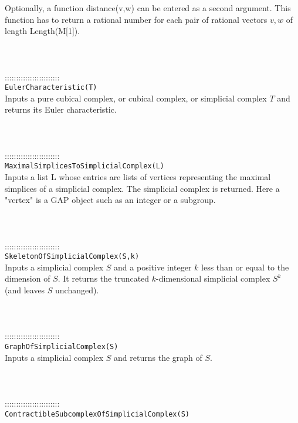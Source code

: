 \documentclass[a4paper,11pt]{report}
\begin{document}
{ Optionally, a function distance(v,w) can be entered as a second argument. This
function has to return a rational number for each pair of rational vectors $v,w$ of length Length(M[1]). \\
 \\
 \\
 \\
 ::::::::::::::::::::::::\\
 \texttt{EulerCharacteristic(T)}\\
 

 Inputs a pure cubical complex, or cubical complex, or simplicial complex $T$ and returns its Euler characteristic. \\
 \\
 \\
 \\
 ::::::::::::::::::::::::\\
 \texttt{MaximalSimplicesToSimplicialComplex(L)}\\
 

 Inputs a list L whose entries are lists of vertices representing the maximal
simplices of a simplicial complex. The simplicial complex is returned. Here a
"vertex" is a GAP object such as an integer or a subgroup. \\
 \\
 \\
 \\
 ::::::::::::::::::::::::\\
 \texttt{SkeletonOfSimplicialComplex(S,k)}\\
 

 Inputs a simplicial complex $S$ and a positive integer $k$ less than or equal to the dimension of $S$. It returns the truncated $k$-dimensional simplicial complex $S^k$ (and leaves $S$ unchanged). \\
 \\
 \\
 \\
 ::::::::::::::::::::::::\\
 \texttt{GraphOfSimplicialComplex(S)}\\
 

 Inputs a simplicial complex $S$ and returns the graph of $S$. \\
 \\
 \\
 \\
 ::::::::::::::::::::::::\\
 \texttt{ContractibleSubcomplexOfSimplicialComplex(S)}\\
 

}
\end{document}

